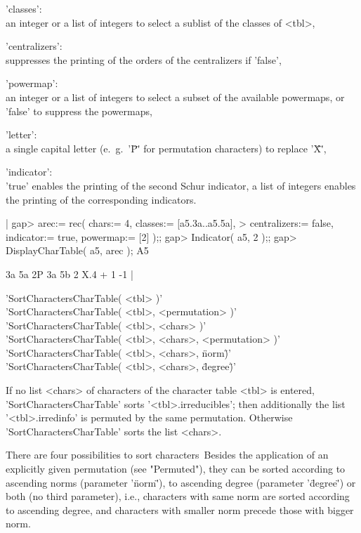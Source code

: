 'classes': \\ an integer or a list of integers to select a sublist of the
classes of <tbl>,

'centralizers': \\ suppresses the printing of the orders of the
centralizers if 'false',

'powermap': \\ an integer or a list of integers to select a subset of the
available powermaps, or 'false' to suppress the powermaps,

'letter': \\ a single capital letter (e.~g.\ '\"P\"' for permutation
characters) to replace '\"X\"',

'indicator': \\ 'true' enables the printing of the second Schur
indicator, a list of integers enables the printing of the corresponding
indicators.

|    gap> arec:= rec( chars:= 4, classes:= [a5.3a..a5.5a],
    > centralizers:= false, indicator:= true, powermap:= [2] );;
    gap> Indicator( a5, 2 );;
    gap> DisplayCharTable( a5, arec );
    A5

              3a 5a
           2P 3a 5b
           2
    X.4    +   1 -1
    |

%
%
%

'SortCharactersCharTable( <tbl> )'\\
'SortCharactersCharTable( <tbl>, <permutation> )'\\
'SortCharactersCharTable( <tbl>, <chars> )'\\
'SortCharactersCharTable( <tbl>, <chars>, <permutation> )'\\
'SortCharactersCharTable( <tbl>, <chars>, \"norm\" )'\\
'SortCharactersCharTable( <tbl>, <chars>, \"degree\" )'

If no list <chars> of characters of the character table <tbl> is
entered, 'SortCharactersCharTable' sorts '<tbl>.irreducibles'; then
additionally the list '<tbl>.irredinfo' is permuted by the same
permutation. Otherwise 'SortCharactersCharTable' sorts the list <chars>.

There are four possibilities to sort characters\:\
Besides the application of an explicitly given permutation (see
"Permuted"), they can be sorted according to ascending norms (parameter
'\"norm\"'), to ascending degree (parameter '\"degree\"') or both (no
third parameter), i.e., characters with same norm are sorted according to
ascending degree, and characters with smaller norm precede those with
bigger norm.

